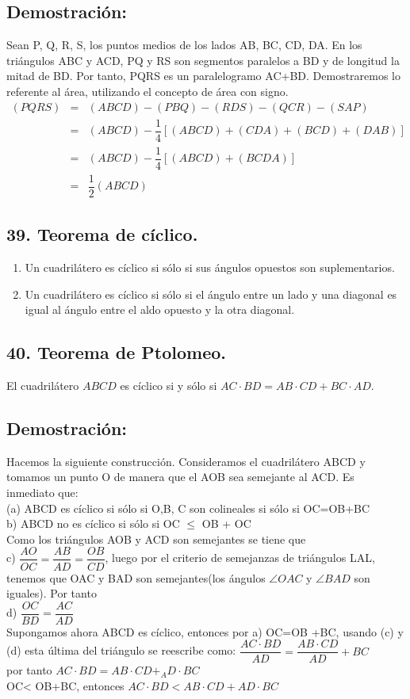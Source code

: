\documentclass[12pt,a4paper]{article}
\begin{document}
\subsection*{Demostración:}
Sean P, Q, R, S, los puntos medios de los lados AB, BC, CD, DA. En los triángulos ABC y ACD, PQ y RS son segmentos paralelos a BD y de longitud la mitad de BD. Por tanto, PQRS es un paralelogramo AC+BD.
Demostraremos lo referente al área, utilizando el concepto de área con signo.
\begin{eqnarray*}
(PQRS) &=& (ABCD)- (PBQ)- (RDS) - (QCR)- (SAP)
\\&=&(ABCD)-\dfrac{1}{4}[(ABCD)+(CDA)+(BCD)+ (DAB) ]
\\&=&(ABCD)-\dfrac{1}{4}[(ABCD)+ (BCDA)]
\\&=&\dfrac{1}{2}(ABCD) 
\end{eqnarray*}

\subsection*{39. Teorema de cíclico.}
\begin{enumerate}
\item Un cuadrilátero es cíclico si sólo si sus ángulos opuestos son suplementarios.
\item Un cuadrilátero es cíclico si sólo si el ángulo entre un lado y una diagonal es igual al ángulo entre el aldo opuesto y la otra diagonal.
\end{enumerate}
\subsection*{40. Teorema de Ptolomeo.}
El cuadrilátero $ABCD$ es cíclico si y sólo si $AC \cdot BD = AB \cdot CD + BC \cdot AD$.
\subsection*{Demostración:}
Hacemos  la siguiente construcción. Consideramos el cuadrilátero ABCD y tomamos un punto O de manera que el AOB sea semejante al ACD. Es inmediato que: 
\\(a) ABCD es cíclico si sólo si O,B, C son colineales si sólo si OC=OB+BC
\\b) ABCD no es cíclico si sólo si OC $\leq$ OB + OC
\\Como los triángulos AOB y ACD son semejantes se tiene que 
\\c) $\dfrac{AO}{OC}=\dfrac{AB}{AD}=\dfrac{OB}{CD}$, luego por el criterio de semejanzas de triángulos LAL, tenemos que OAC y BAD son semejantes(los ángulos $\angle OAC$ y $\angle BAD$ son iguales). Por tanto
\\d) $\dfrac{OC}{BD}=\dfrac{AC}{AD}$
\\Supongamos ahora ABCD es cíclico, entonces por a) OC=OB +BC, usando (c) y (d) esta última del triángulo se reescribe como:
$\dfrac{AC \cdot BD}{AD}=\dfrac{AB \cdot CD}{AD}+BC$
\\por tanto $AC \cdot BD= AB \cdot CD +_ AD \cdot BC$
\\OC< OB+BC, entonces $AC \cdot BD < AB \cdot CD + AD \cdot BC$
\end{document}
